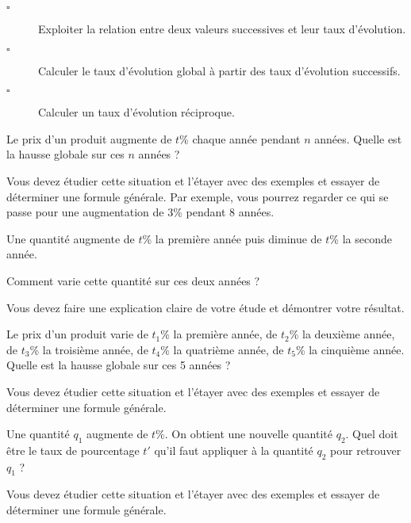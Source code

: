 \documentclass[10pt]{article}
\begin{document}
\begin{titre}

\end{titre}


\begin{CpsCol}
\begin{description}
\item[$\square$] Exploiter la relation entre deux valeurs successives et leur taux d'évolution.
\item[$\square$] Calculer le taux d'évolution global à partir des taux d'évolution successifs. 
\item[$\square$] Calculer un taux d'évolution réciproque.
\end{description}
\end{CpsCol}



\begin{Sit}
Le prix d'un produit augmente de $t$\% chaque année pendant $n$ années. Quelle est la hausse globale sur ces $n$ années ?

Vous devez étudier cette situation et l'étayer avec des exemples et essayer de déterminer une formule générale. Par exemple, vous pourrez regarder ce qui se passe pour une augmentation de $3$\% pendant 8 années.
\end{Sit}



\begin{Sit}
Une quantité augmente de $t$\% la première année puis diminue de $t$\% la seconde année. 

Comment varie cette quantité sur ces deux années ?

Vous devez faire une explication claire de votre étude et démontrer votre résultat. 
\end{Sit}



\begin{Sit}
Le prix d'un produit varie de $t_1$\% la première année, de $t_2$\% la deuxième année, de $t_3$\% la troisième année, de $t_4$\% la quatrième année, de $t_5$\% la cinquième année. Quelle est la hausse globale sur ces 5 années ?

Vous devez étudier cette situation et l'étayer avec des exemples et essayer de déterminer une formule générale. 
\end{Sit}



\begin{Sit}
Une quantité $q_1$ augmente de $t$\%. On obtient une nouvelle quantité $q_2$. Quel doit être le taux de pourcentage $t'$ qu'il faut appliquer à la quantité $q_2$ pour retrouver $q_1$ ?

Vous devez étudier cette situation et l'étayer avec des exemples et essayer de déterminer une formule générale. 
\end{Sit}
\end{document}
